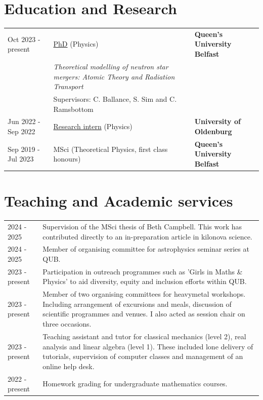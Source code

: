 \documentclass[a4paper,11pt]{article}
\begin{document}
\section{Education and Research}
\begin{tabularx}{\linewidth}{@{}lX l@{}}	
Oct 2023 - present & \href{https://www.qub.ac.uk/schools/SchoolofMathematicsandPhysics/Research/culture-environment/PhDResearchStudents/LeoMulholland-StudentProfile/}{PhD} (Physics)  & \textbf{Queen's University Belfast} \hfill  \\

& \emph{Theoretical modelling of neutron star
mergers: \newline Atomic Theory and Radiation
Transport} & \\
& Supervisors: C. Ballance, S. Sim and C. Ramsbottom & \\
Jun 2022 - Sep 2022  & \href{https://uol.de/en/compphys/members}{Research intern} (Physics)  & \textbf{University of Oldenburg} \hfill  \\
Sep 2019 - Jul 2023 & MSci (Theoretical Physics, first class honours) & \textbf{Queen's University Belfast} \\ 
\end{tabularx}




\section{Teaching and Academic services}
\begin{tabularx}{\linewidth}{@{}l X@{}}
2024 - 2025 &  Supervision of the MSci thesis of Beth Campbell. This work has contributed directly to an in-preparation article in kilonova science.\\
2024 - 2025 & Member of organising committee for astrophysics seminar series at QUB. \\
2023 - present & Participation in outreach programmes such as 'Girls in Maths \& Physics' to aid diversity, equity and inclusion efforts within QUB.  \\
2023 - present & Member of two organising committees  for  {\sc heavymetal} workshops. Including arrangement of  excursions and meals, discussion of scientific programmes and venues. I also acted as session chair on three occasions.\\
2023 - present & Teaching assistant and tutor for classical mechanics (level 2), real analysis and linear algebra (level 1). These included lone delivery of tutorials, supervision of computer classes and management of an online help desk.\\
2022 - present & Homework grading for undergraduate mathematics courses.
\end{tabularx}
\end{document}
